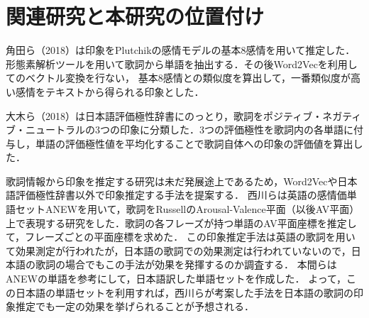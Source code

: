 \documentclass[a4paper,10pt,twocolumn]{jsarticle}
\begin{document}
\section{関連研究と本研究の位置付け}
角田ら（2018）\cite{4}は印象をPlutchikの感情モデルの基本8感情\cite{5}を用いて推定した．形態素解析ツールを用いて歌詞から単語を抽出する．その後Word2Vecを利用してのベクトル変換を行ない，
基本8感情との類似度を算出して，一番類似度が高い感情をテキストから得られる印象とした．

大木ら（2018）\cite{6}は日本語評価極性辞書にのっとり，歌詞をポジティブ・ネガティブ・ニュートラルの3つの印象に分類した．3つの評価極性を歌詞内の各単語に付与し，単語の評価極性値を平均化することで歌詞自体への印象の評価値を算出した．

歌詞情報から印象を推定する研究は未だ発展途上であるため，Word2Vecや日本語評価極性辞書以外で印象推定する手法を提案する．
西川ら\cite{3}は英語の感情価単語セットANEW\cite{7}を用いて，歌詞をRussellのArousal-Valence平面\cite{9}（以後AV平面）上で表現する研究をした．歌詞の各フレーズが持つ単語のAV平面座標を推定して，フレーズごとの平面座標を求めた．
この印象推定手法は英語の歌詞を用いて効果測定が行われたが，日本語の歌詞での効果測定は行われていないので，日本語の歌詞の場合でもこの手法が効果を発揮するのか調査する．
本間ら\cite{8}はANEWの単語を参考にして，日本語訳した単語セットを作成した．
よって，この日本語の単語セットを利用すれば，西川らが考案した手法を日本語の歌詞の印象推定でも一定の効果を挙げられることが予想される．

%
\end{document}
